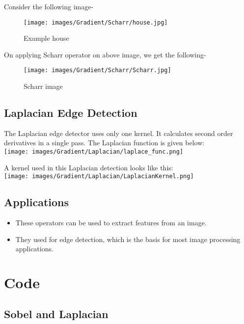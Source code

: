 \documentclass[]{article}
\providecommand{\tightlist}{%
  \setlength{\itemsep}{0pt}\setlength{\parskip}{0pt}}
\begin{document}
Consider the following image-

\begin{figure}[htbp]
\centering
\texttt{[image: images/Gradient/Scharr/house.jpg]}
\caption{Example house}
\end{figure}

On applying Scharr operator on above image, we get the following-

\begin{figure}[htbp]
\centering
\texttt{[image: images/Gradient/Scharr/Scharr.jpg]}
\caption{Scharr image}
\end{figure}

\subsection{Laplacian Edge Detection}\label{laplacian-edge-detection}

The Laplacian edge detector uses only one kernel. It calculates second
order derivatives in a single pass. The Laplacian function is given
below:\\
\texttt{[image: images/Gradient/Laplacian/laplace\_func.png]}

A kernel used in this Laplacian detection looks like this:\\
\texttt{[image: images/Gradient/Laplacian/LaplacianKernel.png]}

\subsection{Applications}\label{applications}

\begin{itemize}
\tightlist
\item
  These operators can be used to extract features from an image.
\item
  They used for edge detection, which is the basis for most image
  processing applications.
\end{itemize}

\section{Code}\label{code}

\subsection{Sobel and Laplacian}\label{sobel-and-laplacian}
\end{document}
